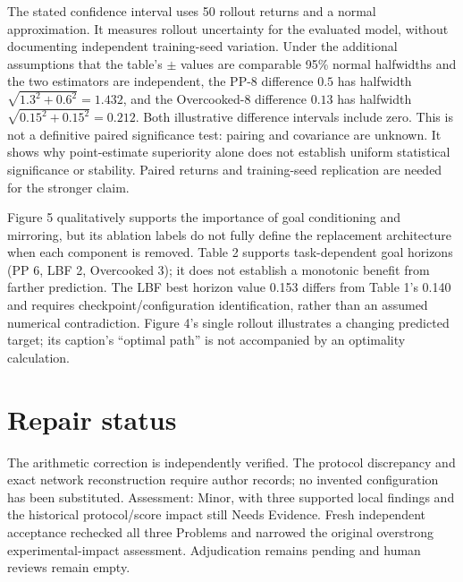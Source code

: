 \documentclass[10pt]{article}
\begin{document}
The stated confidence interval uses 50 rollout returns and a normal approximation. It measures rollout uncertainty for the evaluated model, without documenting independent training-seed variation. Under the additional assumptions that the table’s \(\pm\) values are comparable 95\% normal halfwidths and the two estimators are independent, the PP-8 difference \(0.5\) has halfwidth \(\sqrt{1.3^2+0.6^2}=1.432\), and the Overcooked-8 difference \(0.13\) has halfwidth \(\sqrt{0.15^2+0.15^2}=0.212\). Both illustrative difference intervals include zero. This is not a definitive paired significance test: pairing and covariance are unknown. It shows why point-estimate superiority alone does not establish uniform statistical significance or stability. Paired returns and training-seed replication are needed for the stronger claim.\par
Figure 5 qualitatively supports the importance of goal conditioning and mirroring, but its ablation labels do not fully define the replacement architecture when each component is removed. Table 2 supports task-dependent goal horizons (PP 6, LBF 2, Overcooked 3); it does not establish a monotonic benefit from farther prediction. The LBF best horizon value 0.153 differs from Table 1’s 0.140 and requires checkpoint/configuration identification, rather than an assumed numerical contradiction. Figure 4’s single rollout illustrates a changing predicted target; its caption’s “optimal path” is not accompanied by an optimality calculation.\par
\section*{Repair status}
The arithmetic correction is independently verified. The protocol discrepancy and exact network reconstruction require author records; no invented configuration has been substituted. Assessment: Minor, with three supported local findings and the historical protocol/score impact still Needs Evidence. Fresh independent acceptance rechecked all three Problems and narrowed the original overstrong experimental-impact assessment. Adjudication remains pending and human reviews remain empty.\par
\end{document}
